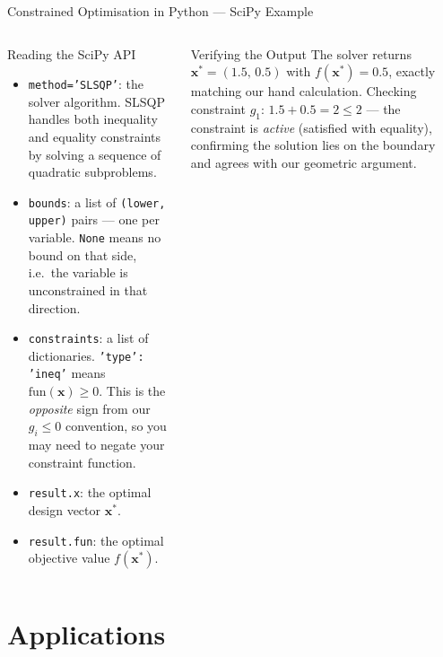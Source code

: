\documentclass[aspectratio=169,10pt]{beamer}
\newcommand{\vx}{\mathbf{x}}
\begin{document}
\begin{frame}[fragile]{Constrained Optimisation in Python --- SciPy Example}
\begin{columns}[T]
      \begin{block}{Reading the SciPy API}
        \begin{itemize}
          \item \texttt{method='SLSQP'}: the solver algorithm.  SLSQP handles
            both inequality and equality constraints by solving a sequence of
            quadratic subproblems.
          \item \texttt{bounds}: a list of \texttt{(lower, upper)} pairs ---
            one per variable.  \texttt{None} means no bound on that side,
            i.e.\ the variable is unconstrained in that direction.
          \item \texttt{constraints}: a list of dictionaries.  \texttt{'type':
            'ineq'} means $\text{fun}(\vx) \geq 0$.  This is the
            \emph{opposite} sign from our $g_i \leq 0$ convention, so you
            may need to negate your constraint function.
          \item \texttt{result.x}: the optimal design vector $\vx^*$.
          \item \texttt{result.fun}: the optimal objective value $f(\vx^*)$.
        \end{itemize}
      \end{block}
      \begin{exampleblock}{Verifying the Output}
        The solver returns $\vx^* = (1.5,\, 0.5)$ with $f(\vx^*) = 0.5$,
        exactly matching our hand calculation.  Checking constraint $g_1$:
        $1.5 + 0.5 = 2 \leq 2$ --- the constraint is \emph{active}
        (satisfied with equality), confirming the solution lies on the boundary
        and agrees with our geometric argument.
      \end{exampleblock}
  \end{columns}

\end{frame}

\section{Applications}
\end{document}
